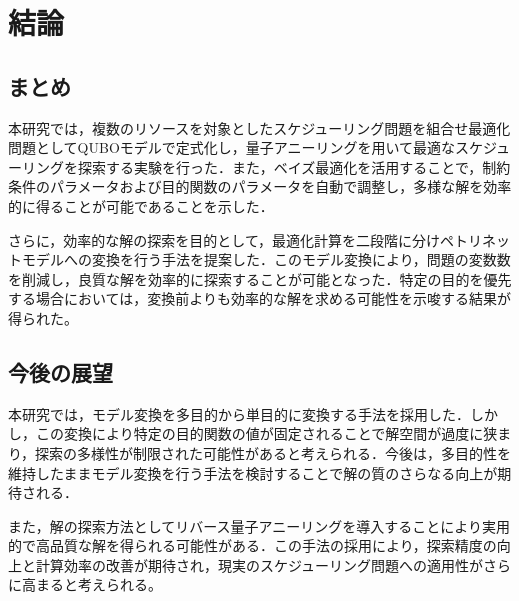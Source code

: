 \chapter{結論}
\section{まとめ}
本研究では，複数のリソースを対象としたスケジューリング問題を組合せ最適化問題としてQUBOモデルで定式化し，量子アニーリングを用いて最適なスケジューリングを探索する実験を行った．また，ベイズ最適化を活用することで，制約条件のパラメータおよび目的関数のパラメータを自動で調整し，多様な解を効率的に得ることが可能であることを示した．

さらに，効率的な解の探索を目的として，最適化計算を二段階に分けペトリネットモデルへの変換を行う手法を提案した．このモデル変換により，問題の変数数を削減し，良質な解を効率的に探索することが可能となった．特定の目的を優先する場合においては，変換前よりも効率的な解を求める可能性を示唆する結果が得られた。

\section{今後の展望}
本研究では，モデル変換を多目的から単目的に変換する手法を採用した．しかし，この変換により特定の目的関数の値が固定されることで解空間が過度に狭まり，探索の多様性が制限された可能性があると考えられる．今後は，多目的性を維持したままモデル変換を行う手法を検討することで解の質のさらなる向上が期待される．

また，解の探索方法としてリバース量子アニーリングを導入することにより実用的で高品質な解を得られる可能性がある．この手法の採用により，探索精度の向上と計算効率の改善が期待され，現実のスケジューリング問題への適用性がさらに高まると考えられる。
